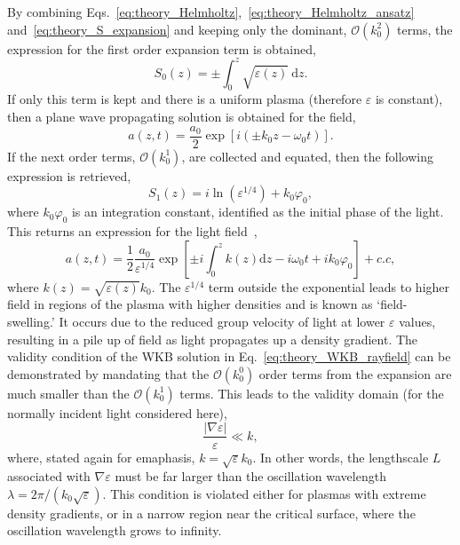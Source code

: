 By combining Eqs.~\ref{eq:theory_Helmholtz},~\ref{eq:theory_Helmholtz_ansatz} and~\ref{eq:theory_S_expansion} and keeping only the dominant, $\mathcal{O}(k_0^2)$ terms, the expression for the first order expansion term is obtained,
\begin{equation}
    S_0(z) = \pm \int_0^z \sqrt{\varepsilon(z)}\ \text{d}z.
\end{equation}
If only this term is kept and there is a uniform plasma (therefore $\varepsilon$ is constant), then a plane wave propagating solution is obtained for the field,
\begin{equation}
    a(z,t) = \frac{a_0}{2} \exp{\left[  i (\pm k_0 z - \omega_0 t )\right]}.
\end{equation}
If the next order terms, $\mathcal{O}(k_0^1)$, are collected and equated, then the following expression is retrieved,
\begin{equation}
    S_1(z) = i \ln{\left( \varepsilon^{1/4} \right)} + k_0 \varphi_0,
\end{equation}
where $k_0\varphi_0$ is an integration constant, identified as the initial phase of the light.
This returns an expression for the light field~\cite{michel_introduction_2023},
\begin{equation}
    \label{eq:theory_WKB_rayfield}
    a(z,t) = \frac{1}{2}\frac{a_0}{\varepsilon^{1/4}}\exp{ \left[ \pm i \int_0^z k(z) \text{d}z - i\omega_0 t +ik_0\varphi_0 \right] } + c.c,
\end{equation}
where $k(z)=\sqrt{\varepsilon(z)}k_0$.
The $\varepsilon^{1/4}$ term outside the exponential leads to higher field in regions of the plasma with higher densities and is known as `field-swelling.'
It occurs due to the reduced group velocity of light at lower $\varepsilon$ values, resulting in a pile up of field as light propagates up a density gradient.
The validity condition of the WKB solution in Eq.~\ref{eq:theory_WKB_rayfield} can be demonstrated by mandating that the $\mathcal{O}(k_0^0)$ order terms from the expansion are much smaller than the $\mathcal{O}(k_0^1)$ terms.
This leads to the validity domain (for the normally incident light considered here),
\begin{equation}
    \frac{|\nabla \varepsilon|}{\varepsilon} \ll k,
\end{equation}
where, stated again for emaphasis, $k=\sqrt{\varepsilon}k_0$.
In other words, the lengthscale $L$ associated with $\nabla\varepsilon$ must be far larger than the oscillation wavelength $\lambda = 2\pi/(k_0\sqrt{\varepsilon})$.
This condition is violated either for plasmas with extreme density gradients, or in a narrow region near the critical surface, where the oscillation wavelength grows to infinity.

